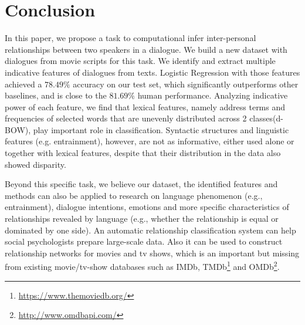 \section{Conclusion}
\label{sec:conclusion}
In this paper, we propose a task to computational infer inter-personal
relationships between two speakers in a dialogue. 
We build a new dataset with dialogues from movie scripts for this task. 
We identify and extract multiple indicative features of dialogues from texts. 
Logistic Regression with those features achieved a $78.49\%$ accuracy on 
our test set, which significantly outperforms other baselines,
and is close to the $81.69\%$ human performance. 
Analyzing indicative power of each feature, we find that lexical features, 
namely address terms and frequencies
of selected words that are unevenly distributed across 2 classes(d-BOW), 
play important role in classification. Syntactic structures and 
linguistic features (e.g. entrainment), however, are not as informative,
either used alone or together with lexical features, despite that their 
distribution in the data also showed disparity.

Beyond this specific task, we believe our dataset, 
the identified features and methods can also be applied to 
research on language phenomenon (e.g., entrainment),  dialogue intentions, 
emotions and more specific characteristics of relationships 
revealed by language (e.g., whether the relationship is equal 
or dominated by one side). An automatic relationship classification system 
can help social psychologists prepare large-scale data. Also it can 
be used to construct relationship networks for movies and tv shows, 
which is an important but missing from existing movie/tv-show databases 
such as IMDb, TMDb\footnote{\url{https://www.themoviedb.org/}} and 
OMDb\footnote{\url{http://www.omdbapi.com/}}. 
